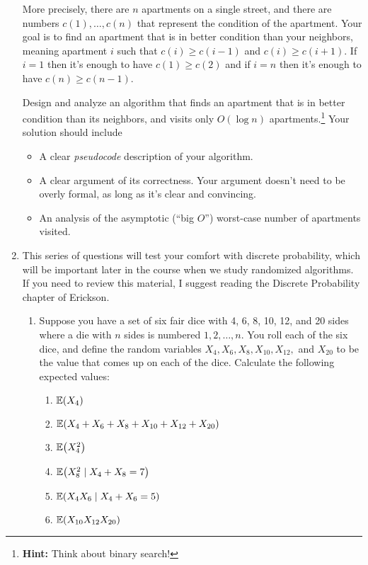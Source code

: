 \documentclass[11pt]{article}
\let\originalleft\left
\let\originalright\right
\renewcommand{\left}{\mathopen{}\mathclose\bgroup\originalleft}
\renewcommand{\right}{\aftergroup\egroup\originalright}
\newcommand{\ex}[2]{{\ifx&#1& \mathbb{E} \else \underset{#1}{\mathbb{E}} \fi \left(#2\right)}}
\theoremstyle{definition}
\begin{document}
\begin{enumerate}[leftmargin=0pt, itemsep=3ex]
    More precisely, there are $n$ apartments on a single street, and there are numbers $c(1),\dots,c(n)$ that represent the condition of the apartment.  Your goal is to find an apartment that is in better condition than your neighbors, meaning apartment $i$ such that $c(i) \geq c(i-1)$ and $c(i) \geq c(i+1)$.  If $i = 1$ then it's enough to have $c(1) \geq c(2)$ and if $i = n$ then it's enough to have $c(n) \geq c(n-1)$.  
    
    Design and analyze an algorithm that finds an apartment that is in better condition than its neighbors, and visits only $O(\log n)$ apartments.\footnote{{\bf Hint:} Think about binary search!}  Your solution should include
    \begin{itemize}[nosep]
            \item A clear \emph{pseudocode} description of your algorithm.
            \item A clear argument of its correctness.  Your argument doesn't need to be overly formal, as long as it's clear and convincing.
            \item An analysis of the asymptotic (``big $O$'') worst-case number of apartments visited.
        \end{itemize}
    
\item This series of questions will test your comfort with discrete probability, which will be important later in the course when we study randomized algorithms.  If you need to review this material, I suggest reading the Discrete Probability chapter of Erickson.
    \begin{enumerate}[leftmargin=0pt, itemsep=3ex]
        \item Suppose you have a set of six fair dice with 4, 6, 8, 10, 12, and 20 sides where a die with $n$ sides is numbered $1,2,\dots,n$.  You roll each of the six dice, and define the random variables $X_4, X_6, X_8, X_{10}, X_{12},$ and $X_{20}$ to be the value that comes up on each of the dice.  Calculate the following expected values:
        \renewcommand{\labelenumiii}{(\alph{enumiii})}
        \begin{enumerate}
            \item $\ex{}{X_{4}}$
            \item $\ex{}{X_{4} + X_{6} + X_{8} + X_{10} + X_{12} + X_{20}}$
            \item $\ex{}{X_{4}^{2}}$
            \item $\ex{}{X_{8}^{2} \mid X_{4} + X_{8} = 7}$
            \item $\ex{}{X_{4}X_{6} \mid X_{4} + X_{6} = 5}$
            \item $\ex{}{X_{10} X_{12} X_{20}}$
        \end{enumerate}
        

\end{enumerate}
\end{enumerate}
\end{document}
